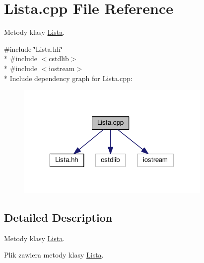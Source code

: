 \hypertarget{a00015}{}\section{Lista.\+cpp File Reference}
\label{a00015}


Metody klasy \hyperlink{a00005}{Lista}.  


{\ttfamily \#include \char`\"{}Lista.\+hh\char`\"{}}\\*
{\ttfamily \#include $<$cstdlib$>$}\\*
{\ttfamily \#include $<$iostream$>$}\\*
Include dependency graph for Lista.\+cpp\+:\nopagebreak
\begin{figure}[H]
\begin{center}
\leavevmode
\includegraphics[width=266pt]{a00033}
\end{center}
\end{figure}


\subsection{Detailed Description}
Metody klasy \hyperlink{a00005}{Lista}. 

Plik zawiera metody klasy \hyperlink{a00005}{Lista}. 